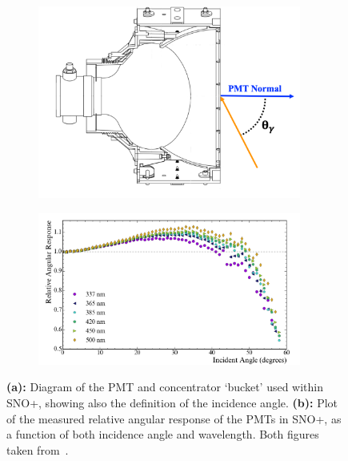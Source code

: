 \begin{figure}
    \centering
    \begin{subfigure}{0.3\textwidth}
        \centering
        \includegraphics[width=0.95\textwidth]{2_Detector/Figs/pmt_bucket_assembly.png}
        \caption{}
        \label{fig:pmt_conc_diagram}
    \end{subfigure}
    \begin{subfigure}{0.69\textwidth}
        \centering
        \includegraphics[width=0.95\textwidth]{2_Detector/Figs/PMTResponse.png}
        \caption{}
        \label{fig:pmt_angular_response}
    \end{subfigure}
    \caption[]{\textbf{(a):} Diagram of the PMT and concentrator `bucket' used within SNO+, showing also the definition of the incidence angle. \textbf{(b):} Plot of the measured relative angular response of the PMTs in SNO+, as a function of both incidence angle and wavelength. Both figures taken from~\cite{andersonOpticalCalibrationSNO2021}.
    }
    \label{fig:pmt_optics}
\end{figure}

